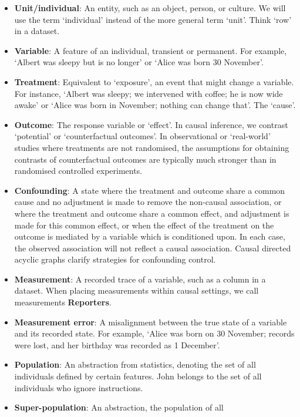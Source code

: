 \documentclass[
  single column]{article}
\begin{document}
\begin{itemize}
\item
  \textbf{Unit/individual}: An entity, such as an object, person, or
  culture. We will use the term `individual' instead of the more general
  term `unit'. Think `row' in a dataset.
\item
  \textbf{Variable}: A feature of an individual, transient or permanent.
  For example, `Albert was sleepy but is no longer' or `Alice was born
  30 November'.
\item
  \textbf{Treatment}: Equivalent to `exposure', an event that might
  change a variable. For instance, `Albert was sleepy; we intervened
  with coffee; he is now wide awake' or `Alice was born in November;
  nothing can change that'. The `cause'.
\item
  \textbf{Outcome}: The response variable or `effect'. In causal
  inference, we contrast `potential' or `counterfactual outcomes'. In
  observational or `real-world' studies where treatments are not
  randomised, the assumptions for obtaining contrasts of counterfactual
  outcomes are typically much stronger than in randomised controlled
  experiments.
\item
  \textbf{Confounding}: A state where the treatment and outcome share a
  common cause and no adjustment is made to remove the non-causal
  association, or where the treatment and outcome share a common effect,
  and adjustment is made for this common effect, or when the effect of
  the treatment on the outcome is mediated by a variable which is
  conditioned upon. In each case, the observed association will not
  reflect a causal association. Causal directed acyclic graphs clarify
  strategies for confounding control.
\item
  \textbf{Measurement}: A recorded trace of a variable, such as a column
  in a dataset. When placing measurements within causal settings, we
  call measurements \textbf{Reporters}.
\item
  \textbf{Measurement error}: A misalignment between the true state of a
  variable and its recorded state. For example, `Alice was born on 30
  November; records were lost, and her birthday was recorded as 1
  December'.
\item
  \textbf{Population}: An abstraction from statistics, denoting the set
  of all individuals defined by certain features. John belongs to the
  set of all individuals who ignore instructions.
\item
  \textbf{Super-population}: An abstraction, the population of all

\end{itemize}
\end{document}
